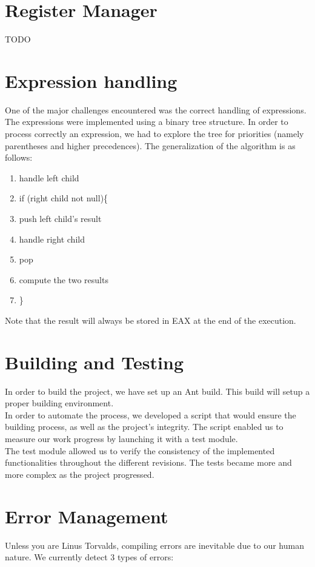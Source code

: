 \documentclass{article}
\begin{document}
\section{Register Manager}
TODO

\section{Expression handling}
One of the major challenges encountered was the correct handling of expressions.
The expressions were implemented using a binary tree structure. In order to process correctly an expression, we had to explore the tree for priorities (namely parentheses and higher precedences). The generalization of the algorithm is as follows:

\begin{enumerate}
\item handle left child
\item if (right child not null)\{
\item   push left child's result
\item   handle right child
\item   pop
\item   compute the two results
\item \}
\end{enumerate}

Note that the result will always be stored in EAX at the end of the execution.

\section{Building and Testing}
In order to build the project, we have set up an Ant build. This build will setup a proper building environment.\\
In order to automate the process, we developed a script that would ensure the building process, as well as the project's integrity. The script enabled us to measure our work progress by launching it with a test module.\\
The test module allowed us to verify the consistency of the implemented functionalities throughout the different revisions. The tests became more and more complex as the project progressed.

\section{Error Management}
Unless you are Linus Torvalds, compiling errors are inevitable due to our human nature. We currently detect 3 types of errors:
\end{document}
